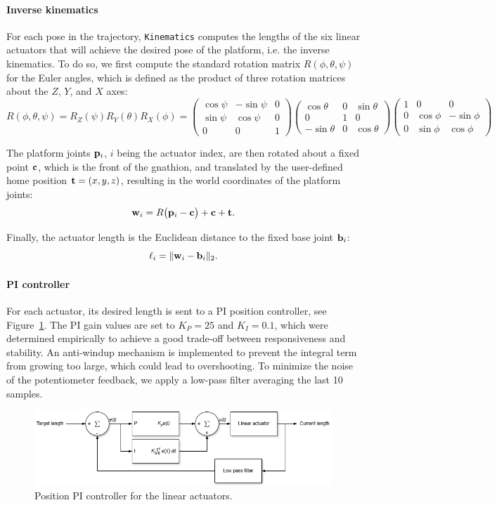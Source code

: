 \paragraph{Inverse kinematics}
For each pose in the trajectory, \texttt{Kinematics} computes the lengths of the six linear actuators that will achieve 
the desired pose of the platform, i.e. the inverse kinematics. To do so, we first compute the standard rotation matrix 
$R(\phi,\theta,\psi)$ for the Euler angles, which is defined as the product of three rotation matrices about 
the $Z$, $Y$, and $X$ axes:
\[
R(\phi,\theta,\psi) = R_Z(\psi) R_Y(\theta) R_X(\phi) =
\begin{pmatrix}
\cos\psi & -\sin\psi & 0 \\
\sin\psi & \cos\psi & 0 \\
0 & 0 & 1
\end{pmatrix}
\begin{pmatrix}
\cos\theta & 0 & \sin\theta \\
0 & 1 & 0 \\
-\sin\theta & 0 & \cos\theta
\end{pmatrix}
\begin{pmatrix}
1 & 0 & 0 \\
0 & \cos\phi & -\sin\phi \\
0 & \sin\phi & \cos\phi
\end{pmatrix}
\]

The platform joints ${\bf p}_i$, $i$ being the actuator index, are then rotated about a fixed point ${\bf c}$, 
which is the front of the gnathion, and translated by the user-defined home position ${\bf t}=(x,y,z)$, 
resulting in the world coordinates of the platform joints:
\[
{\bf w}_i = R\bigl({\bf p}_i-{\bf c}\bigr)+{\bf c}+{\bf t}.
\]

Finally, the actuator length is the Euclidean distance to the fixed base joint ${\bf b}_i$:
\[
\ell_i = \lVert {\bf w}_i-{\bf b}_i\rVert_2.
\]

\paragraph{PI controller}
For each actuator, its desired length is sent to a PI position controller, see Figure~\ref{fig:actuator_pi}. The PI gain values 
are set to $K_P=25$ and $K_I=0.1$, which were determined empirically to achieve a good trade-off between responsiveness and stability. 
An anti-windup mechanism is implemented to prevent the integral term from growing too large, which could lead to overshooting. 
To minimize the noise of the potentiometer feedback, we apply a low-pass filter averaging the last 10 samples.
\begin{figure}[H]
\centering
\includegraphics[width=\textwidth]{figures/actuator_pi.drawio.png}
\caption{Position PI controller for the linear actuators.}
\label{fig:actuator_pi}
\end{figure}

